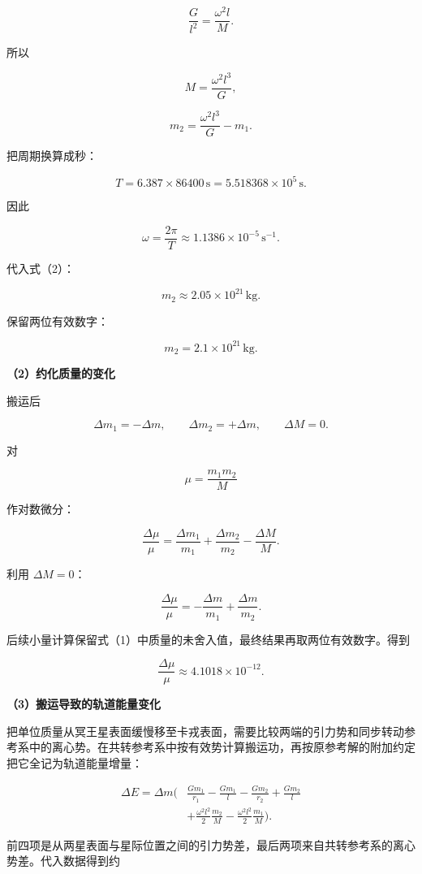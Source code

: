 \documentclass[12pt,a4paper,UTF8]{ctexart}
\begin{document}
\[
\frac G{l^2}=\frac{\omega^2l}{M}.
\]

所以

\[
M=\frac{\omega^2l^3}{G},
\]

\[
\boxed{m_2=\frac{\omega^2l^3}{G}-m_1}.
\tag{2}
\]

把周期换算成秒：

\[
T=6.387\times86400\,\mathrm s
=5.518368\times10^5\,\mathrm s.
\]

因此

\[
\omega=\frac{2\pi}{T}
\approx1.1386\times10^{-5}\,\mathrm{s^{-1}}.
\]

代入式（2）：

\[
m_2\approx2.05\times10^{21}\,\mathrm{kg}.
\]

保留两位有效数字：

\[
\boxed{m_2=2.1\times10^{21}\,\mathrm{kg}}.
\tag{3}
\]

\textbf{（2）约化质量的变化}

搬运后

\[
\Delta m_1=-\Delta m,
\qquad
\Delta m_2=+\Delta m,
\qquad
\Delta M=0.
\]

对

\[
\mu=\frac{m_1m_2}{M}
\]

作对数微分：

\[
\frac{\Delta\mu}{\mu}
=\frac{\Delta m_1}{m_1}
+\frac{\Delta m_2}{m_2}
-\frac{\Delta M}{M}.
\]

利用 \(\Delta M=0\)：

\[
\boxed{
\frac{\Delta\mu}{\mu}
=-\frac{\Delta m}{m_1}+\frac{\Delta m}{m_2}
}.
\tag{4}
\]

后续小量计算保留式（1）中质量的未舍入值，最终结果再取两位有效数字。得到

\[
\boxed{\frac{\Delta\mu}{\mu}\approx4.1018\times10^{-12}}.
\tag{5}
\]

\textbf{（3）搬运导致的轨道能量变化}

把单位质量从冥王星表面缓慢移至卡戎表面，需要比较两端的引力势和同步转动参考系中的离心势。在共转参考系中按有效势计算搬运功，再按原参考解的附加约定把它全记为轨道能量增量：

\[
\begin{aligned}
\Delta E=\Delta m\Bigg(&
\frac{Gm_1}{r_1}-\frac{Gm_1}{l}
-\frac{Gm_2}{r_2}+\frac{Gm_2}{l}\\
&+\frac{\omega^2l^2}{2}\frac{m_2}{M}
-\frac{\omega^2l^2}{2}\frac{m_1}{M}
\Bigg).
\end{aligned}
\tag{6}
\]

前四项是从两星表面与星际位置之间的引力势差，最后两项来自共转参考系的离心势差。代入数据得到约
\end{document}
